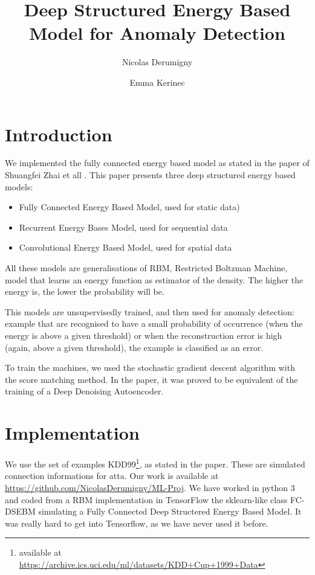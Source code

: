\documentclass[a4paper]{article}
\title{Deep Structured Energy Based Model for Anomaly Detection}
\author{Nicolas Derumigny \and Emma Kerinec }
\begin{document}
\maketitle

\section{Introduction}
We implemented the fully connected energy based model as stated in the paper of Shuangfei Zhai et all \cite{DBLP:conf/icml/ZhaiCLZ16}.
This paper presents three deep structured energy based models: 
\begin{itemize}
\item Fully Connected Energy Based Model, used for static data)
\item Recurrent Energy Bases Model, used for sequential data
\item Convolutional Energy Based Model, used for spatial data
\end{itemize}

All these models are generalisations of RBM, Restricted Boltzman Machine, model that learns an energy function as estimator of the density. The higher the energy is, the lower the probability will be.

This models are unsupervisedly trained, and then used for anomaly detection: example that are recognised to have a small probability of occurrence (when the energy is above a given threshold) or when the reconstruction error is high (again, above a given threshold), the example is classified as an error.


To train the machines, we used the stochastic gradient descent algorithm with the score matching method. In the paper, it was proved to be equivalent of the training of a Deep Denoising Autoencoder.






\section{Implementation}
We use the set of examples KDD99\footnote{available at \url{https://archive.ics.uci.edu/ml/datasets/KDD+Cup+1999+Data}}, as stated in the paper. These are simulated connection informations for atta. 
Our work is available at \url{https://github.com/NicolasDerumigny/ML-Proj}.
We have worked in python 3 and coded from a RBM implementation in  TensorFlow the sklearn-like class FC-DSEBM simulating a Fully Connected Deep Structered Energy Based Model. It was really hard to get into Tensorflow, as we have never used it before. 
\end{document}
